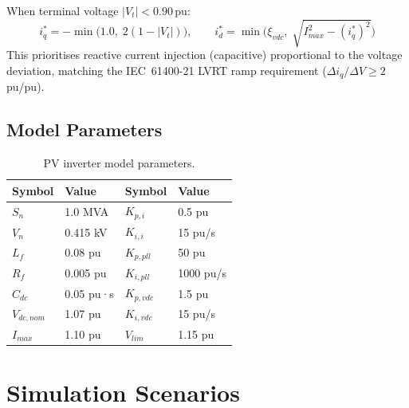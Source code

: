 \documentclass[11pt,a4paper]{article}
\begin{document}
When terminal voltage $|V_t| < 0.90$\,pu:
\begin{equation}
  i_q^\ast = -\min\bigl(1.0,\;2(1 - |V_t|)\bigr),
  \qquad
  i_d^\ast = \min\bigl(\xi_{vdc},\;\sqrt{I_{max}^2 - (i_q^\ast)^2}\bigr)
  \label{eq:lvrt}
\end{equation}
This prioritises reactive current injection (capacitive) proportional to
the voltage deviation, matching the IEC~61400-21 LVRT ramp requirement
($\Delta i_q / \Delta V \ge 2$\,pu/pu).

\subsection{Model Parameters}

\begin{table}[H]
  \centering
  \caption{PV inverter model parameters.}
  \label{tab:params}
  \begin{tabular}{llll}
    \toprule
    Symbol & Value & Symbol & Value \\
    \midrule
    $S_n$      & 1.0 MVA & $K_{p,i}$   & 0.5 pu     \\
    $V_n$      & 0.415 kV & $K_{i,i}$  & 15 pu/s    \\
    $L_f$      & 0.08 pu & $K_{p,pll}$ & 50 pu      \\
    $R_f$      & 0.005 pu & $K_{i,pll}$& 1000 pu/s  \\
    $C_{dc}$   & 0.05 pu·s & $K_{p,vdc}$& 1.5 pu    \\
    $V_{dc,nom}$& 1.07 pu & $K_{i,vdc}$& 15 pu/s   \\
    $I_{max}$  & 1.10 pu & $V_{lim}$   & 1.15 pu    \\
    \bottomrule
  \end{tabular}
\end{table}

\section{Simulation Scenarios}
\end{document}
